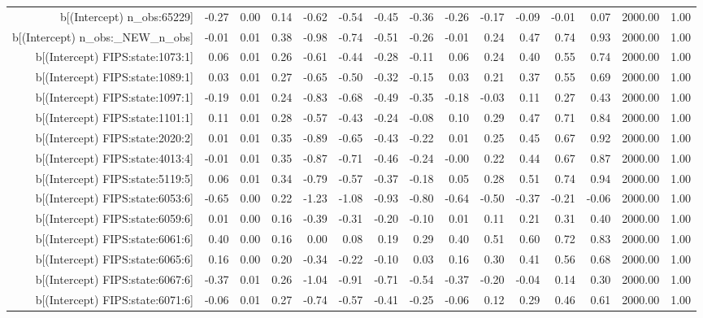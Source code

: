 \begin{table}[ht]
\begin{tabular}{rrrrrrrrrrrrrrr}
  b[(Intercept) n\_obs:65229] & -0.27 & 0.00 & 0.14 & -0.62 & -0.54 & -0.45 & -0.36 & -0.26 & -0.17 & -0.09 & -0.01 & 0.07 & 2000.00 & 1.00 \\ 
  b[(Intercept) n\_obs:\_NEW\_n\_obs] & -0.01 & 0.01 & 0.38 & -0.98 & -0.74 & -0.51 & -0.26 & -0.01 & 0.24 & 0.47 & 0.74 & 0.93 & 2000.00 & 1.00 \\ 
  b[(Intercept) FIPS:state:1073:1] & 0.06 & 0.01 & 0.26 & -0.61 & -0.44 & -0.28 & -0.11 & 0.06 & 0.24 & 0.40 & 0.55 & 0.74 & 2000.00 & 1.00 \\ 
  b[(Intercept) FIPS:state:1089:1] & 0.03 & 0.01 & 0.27 & -0.65 & -0.50 & -0.32 & -0.15 & 0.03 & 0.21 & 0.37 & 0.55 & 0.69 & 2000.00 & 1.00 \\ 
  b[(Intercept) FIPS:state:1097:1] & -0.19 & 0.01 & 0.24 & -0.83 & -0.68 & -0.49 & -0.35 & -0.18 & -0.03 & 0.11 & 0.27 & 0.43 & 2000.00 & 1.00 \\ 
  b[(Intercept) FIPS:state:1101:1] & 0.11 & 0.01 & 0.28 & -0.57 & -0.43 & -0.24 & -0.08 & 0.10 & 0.29 & 0.47 & 0.71 & 0.84 & 2000.00 & 1.00 \\ 
  b[(Intercept) FIPS:state:2020:2] & 0.01 & 0.01 & 0.35 & -0.89 & -0.65 & -0.43 & -0.22 & 0.01 & 0.25 & 0.45 & 0.67 & 0.92 & 2000.00 & 1.00 \\ 
  b[(Intercept) FIPS:state:4013:4] & -0.01 & 0.01 & 0.35 & -0.87 & -0.71 & -0.46 & -0.24 & -0.00 & 0.22 & 0.44 & 0.67 & 0.87 & 2000.00 & 1.00 \\ 
  b[(Intercept) FIPS:state:5119:5] & 0.06 & 0.01 & 0.34 & -0.79 & -0.57 & -0.37 & -0.18 & 0.05 & 0.28 & 0.51 & 0.74 & 0.94 & 2000.00 & 1.00 \\ 
  b[(Intercept) FIPS:state:6053:6] & -0.65 & 0.00 & 0.22 & -1.23 & -1.08 & -0.93 & -0.80 & -0.64 & -0.50 & -0.37 & -0.21 & -0.06 & 2000.00 & 1.00 \\ 
  b[(Intercept) FIPS:state:6059:6] & 0.01 & 0.00 & 0.16 & -0.39 & -0.31 & -0.20 & -0.10 & 0.01 & 0.11 & 0.21 & 0.31 & 0.40 & 2000.00 & 1.00 \\ 
  b[(Intercept) FIPS:state:6061:6] & 0.40 & 0.00 & 0.16 & 0.00 & 0.08 & 0.19 & 0.29 & 0.40 & 0.51 & 0.60 & 0.72 & 0.83 & 2000.00 & 1.00 \\ 
  b[(Intercept) FIPS:state:6065:6] & 0.16 & 0.00 & 0.20 & -0.34 & -0.22 & -0.10 & 0.03 & 0.16 & 0.30 & 0.41 & 0.56 & 0.68 & 2000.00 & 1.00 \\ 
  b[(Intercept) FIPS:state:6067:6] & -0.37 & 0.01 & 0.26 & -1.04 & -0.91 & -0.71 & -0.54 & -0.37 & -0.20 & -0.04 & 0.14 & 0.30 & 2000.00 & 1.00 \\ 
  b[(Intercept) FIPS:state:6071:6] & -0.06 & 0.01 & 0.27 & -0.74 & -0.57 & -0.41 & -0.25 & -0.06 & 0.12 & 0.29 & 0.46 & 0.61 & 2000.00 & 1.00 \\ 

\end{tabular}
\end{table}
